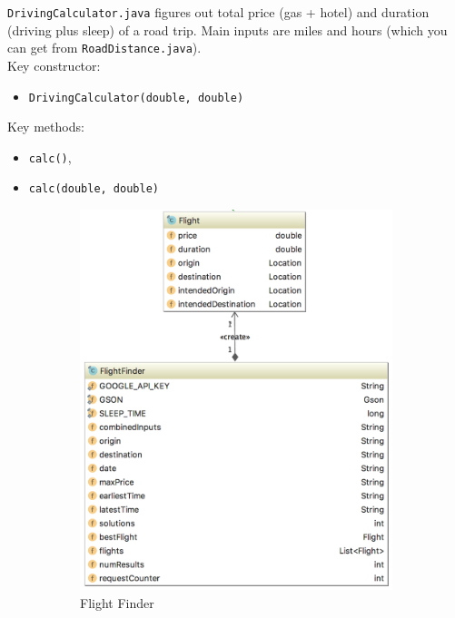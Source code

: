 \documentclass[11pt]{article}
\begin{document}
\texttt{DrivingCalculator.java} figures out total price (gas + hotel) and duration (driving plus sleep) of a road trip. Main inputs are miles and hours (which you can get from
 \texttt{RoadDistance.java}).\\
 Key constructor:
 \begin{itemize}
 \item  \texttt{DrivingCalculator(double, double)}
 \end{itemize}
  Key methods:
  \begin{itemize}
\item  \texttt{calc()},
 \item  \texttt{calc(double, double)}
 \end{itemize}

\begin{figure}
\centering
\begin{subfigure}{.4\textwidth}
\centering
  \includegraphics[width=1\linewidth]{FlightFinder.png}
  \caption{Flight Finder}
  \label{fig:flfinder}
\end{subfigure}%
\begin{subfigure}{.6\textwidth}

\end{subfigure}
\end{figure}
\end{document}
